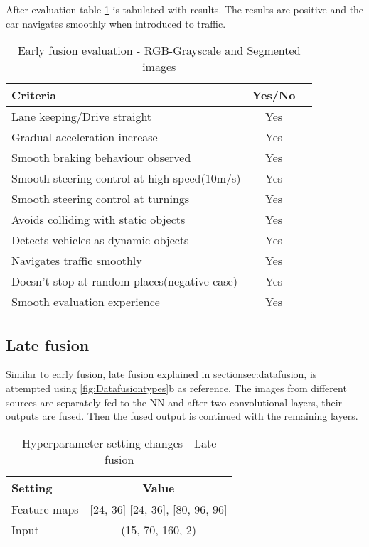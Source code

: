 After evaluation table \ref{table:earlyfusionrgbseg} is tabulated with results. The
results are positive and the car navigates smoothly when introduced to traffic.
\begin{table}[!ht]
    \centering
\begin{tabular}{lcc}
    \toprule
    Criteria  &  Yes/No  \\\midrule
    Lane keeping/Drive straight  & Yes  \\
    Gradual acceleration increase  & Yes\\
    Smooth braking behaviour observed & Yes \\
    Smooth steering control at high speed(10m/s) & Yes \\
    Smooth steering control at turnings & Yes\\
    Avoids colliding with static objects & Yes \\
    Detects vehicles as dynamic objects & Yes \\
    Navigates traffic smoothly & Yes\\
    Doesn't stop at random places(negative case) & Yes \\
    Smooth evaluation experience & Yes \\\bottomrule
\end{tabular}
\caption{Early fusion evaluation - RGB-Grayscale and Segmented images}
\label{table:earlyfusionrgbseg}
\end{table}

\subsection{Late fusion}
Similar to early fusion, late fusion explained in section{sec:datafusion}, is attempted
using \ref{fig:Datafusiontypes}b as reference. The images from different sources
are separately fed to the NN and after two convolutional layers,
their outputs are fused. Then the fused output is continued with the remaining layers.
\begin{table}[!ht]
    \centering
\begin{tabular}{lc}
    \toprule
    Setting  & Value  \\\midrule
    Feature maps  & [24, 36] [24, 36], [80, 96, 96]  \\
    Input  & (15, 70, 160, 2)\\\bottomrule
\end{tabular}
\caption{Hyperparameter setting changes - Late fusion}
\label{table:paramsLF}
\end{table}

